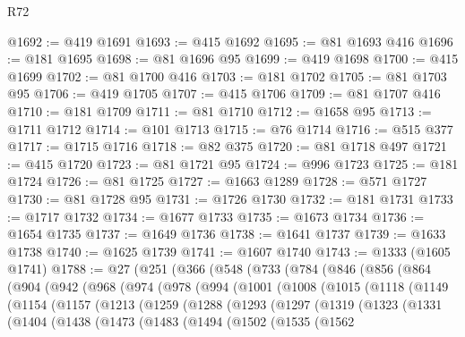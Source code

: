 \begin{lexlean}{R72}
\begin{coremodule}
@1692 := @419 @1691
@1693 := @415 @1692
@1695 := @81 @1693 @416
@1696 := @181 @1695
@1698 := @81 @1696 @95
@1699 := @419 @1698
@1700 := @415 @1699
@1702 := @81 @1700 @416
@1703 := @181 @1702
@1705 := @81 @1703 @95
@1706 := @419 @1705
@1707 := @415 @1706
@1709 := @81 @1707 @416
@1710 := @181 @1709
@1711 := @81 @1710
@1712 := @1658 @95
@1713 := @1711 @1712
@1714 := @101 @1713
@1715 := @76 @1714
@1716 := @515 @377
@1717 := @1715 @1716
@1718 := @82 @375
@1720 := @81 @1718 @497
@1721 := @415 @1720
@1723 := @81 @1721 @95
@1724 := @996 @1723
@1725 := @181 @1724
@1726 := @81 @1725
@1727 := @1663 @1289
@1728 := @571 @1727
@1730 := @81 @1728 @95
@1731 := @1726 @1730
@1732 := @181 @1731
@1733 := @1717 @1732
@1734 := @1677 @1733
@1735 := @1673 @1734
@1736 := @1654 @1735
@1737 := @1649 @1736
@1738 := @1641 @1737
@1739 := @1633 @1738
@1740 := @1625 @1739
@1741 := @1607 @1740
@1743 := @1333 (@1605 @1741)
@1788 := @27
    (@251
      (@366
        (@548
          (@733
            (@784
              (@846
                (@856
                  (@864
                    (@904
                      (@942
                        (@968
                          (@974
                            (@978
                              (@994
                                (@1001
                                  (@1008
                                    (@1015
                                      (@1118
                                        (@1149
                                          (@1154
                                            (@1157
                                              (@1213
                                                (@1259
                                                  (@1288
                                                    (@1293
                                                      (@1297
                                                        (@1319
                                                          (@1323
                                                            (@1331
                                                              (@1404
                                                                (@1438
                                                                  (@1473
                                                                    (@1483
                                                                      (@1494
                                                                        (@1502
                                                                          (@1535
                                                                            (@1562

\end{coremodule}
\end{lexlean}
